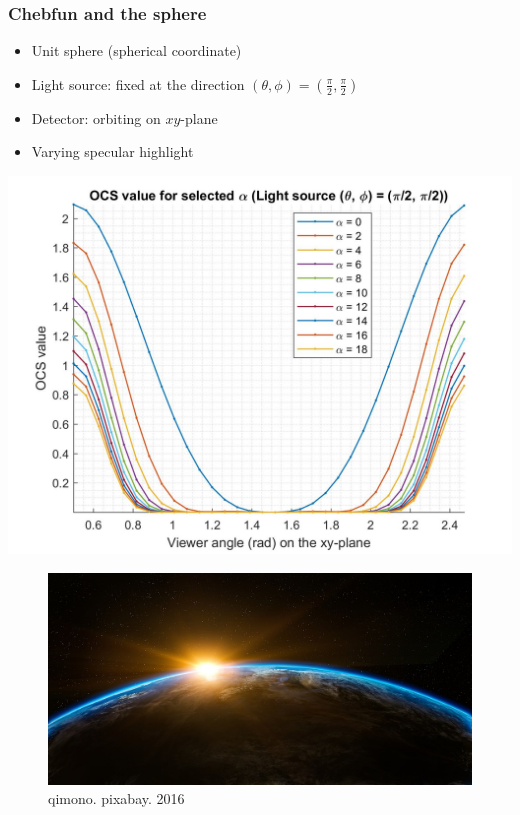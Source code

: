\documentclass{beamer}
\begin{document}
\begin{frame}[t]
\frametitle{Chebfun and the sphere}
\begin{itemize}
\item Unit sphere (spherical coordinate)
\item Light source: fixed at the direction $(\theta,\phi) = (\frac{\pi}{2},\frac{\pi}{2})$
\item Detector: orbiting on $xy$-plane
\item Varying specular highlight
\end{itemize}
\begin{multicols}{2}
\centering \includegraphics[scale=0.13]{./figs/OCS_parallel_plane}
\begin{figure}
\centering \includegraphics[scale=0.1]{./figs/orbiting_example}\caption{qimono.
 pixabay. 2016}
\end{figure}
\end{multicols}
\end{frame}
\end{document}
